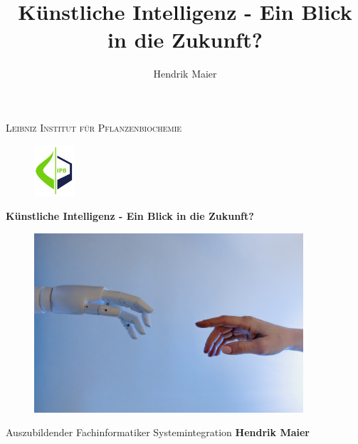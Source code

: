\documentclass[12pt,german,ngerman]{report}
\title{Künstliche Intelligenz - Ein Blick in die Zukunft?}
\author{Hendrik Maier}
\date{}
\begin{document}
    \begin{titlepage}
        \vspace*{\fill}
            \begin{center}
                 \centering
                 {\scshape\LARGE Leibniz Institut für Pflanzenbiochemie\par}
                 \vspace{1cm}
                 \begin{figure}[h]
                     \includegraphics[width=1.5cm]{ipb_logo.png}
                     \centering
                 \end{figure}
                 {\huge\bfseries Künstliche Intelligenz - Ein Blick in die Zukunft?\par}
                 \vspace{1cm}
                 \begin{figure}[h]
                     \includegraphics[width=10cm]{michelangelo_ki.jpg}
                     \centering
                 \end{figure}
                 \vspace{1cm}
                 {\Large Auszubildender Fachinformatiker Systemintegration \textbf{Hendrik Maier}\par}
                 \vfill
            \end{center}    
        \vspace*{\fill}
    \end{titlepage}
    
\end{document}
